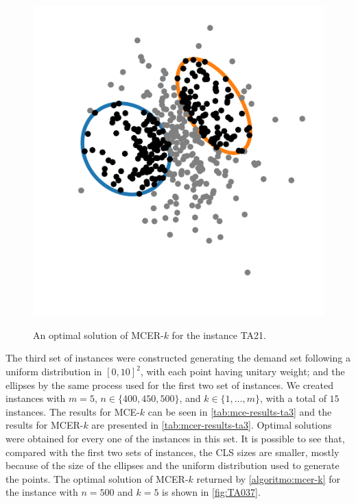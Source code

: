 \begin{figure}[H]
	\centering
	\caption{An optimal solution of MCER-$k$ for the instance TA21.}
	\includegraphics[scale=.8]{tex/figures/TA021}
	\fautor
	\label{fig:TA021}
\end{figure}

The third set of instances were constructed generating the demand set following a uniform distribution in $[0, 10]^2$, with each point having unitary weight; and the ellipses by the same process used for the first two set of instances. We created instances with $m=5$, $n\in \{400, 450, 500\}$, and $k\in\{1, \dots, m\}$, with a total of $15$ instances. The results for MCE-$k$ can be seen in \autoref{tab:mce-results-ta3} and the results for MCER-$k$ are presented in \autoref{tab:mcer-results-ta3}. Optimal solutions were obtained for every one of the instances in this set. It is possible to see that, compared with the first two sets of instances, the CLS sizes are smaller, mostly because of the size of the ellipses and the uniform distribution used to generate the points. The optimal solution of MCER-$k$ returned by \autoref{algoritmo:mcer-k} for the instance with $n=500$ and $k=5$ is shown in \autoref{fig:TA037}.

